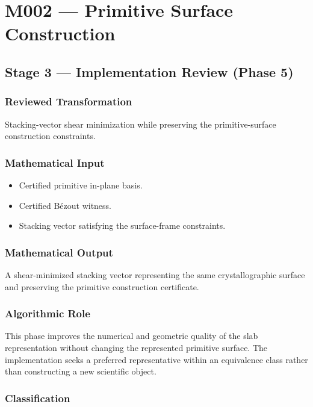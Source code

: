 
\chapter{M002 --- Primitive Surface Construction}

\section{Stage 3 --- Implementation Review (Phase 5)}

\subsection{Reviewed Transformation}

Stacking-vector shear minimization while preserving the primitive-surface
construction constraints.

\subsection{Mathematical Input}

\begin{itemize}
\item Certified primitive in-plane basis.
\item Certified Bézout witness.
\item Stacking vector satisfying the surface-frame constraints.
\end{itemize}

\subsection{Mathematical Output}

A shear-minimized stacking vector representing the same crystallographic
surface and preserving the primitive construction certificate.

\subsection{Algorithmic Role}

This phase improves the numerical and geometric quality of the slab
representation without changing the represented primitive surface. The
implementation seeks a preferred representative within an equivalence
class rather than constructing a new scientific object.

\subsection{Classification}

